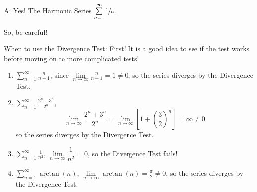 A\@: Yes! The Harmonic Series $ \sum\limits_{n=1}^{\infty}\sfrac{1}{n} $.

So, be careful!

When to use the Divergence Test: First! It is a good idea to see if the test works before
moving on to more complicated tests!

\begin{Example}{}{}
    \begin{enumerate}[label=(\roman*)]
        \item $ \displaystyle\sum\limits_{n=1}^{\infty} \frac{n}{n+1} $, since
              $ \lim\limits_{{n} \to {\infty}} \frac{n}{n+1} =1\neq 0 $, so the series diverges
              by the Divergence Test.
        \item $ \displaystyle\sum\limits_{n=1}^{\infty} \frac{2^{n}+3^n}{2^n} $,
              \[ \lim\limits_{{n} \to {\infty}} \frac{2^n+3^n}{2^n} =\lim\limits_{{n} \to {\infty}}
                  \left[ 1+\left( \frac{3}{2} \right)^n  \right]=\infty\neq 0 \]
              so the series diverges by the Divergence Test.
        \item $ \displaystyle\sum\limits_{n=1}^{\infty} \frac{1}{n^2} $, $ \lim\limits_{{n} \to {\infty}}
                  \dfrac{1}{n^2} =0 $, so the Divergence Test fails!
        \item $ \displaystyle\sum\limits_{n=1}^{\infty} \arctan(n) $, $ \lim\limits_{{n} \to {\infty}}
                  \arctan(n)=\frac{\pi}{2}\neq 0 $, so the series diverges
              by the Divergence Test.
    \end{enumerate}
\end{Example}
